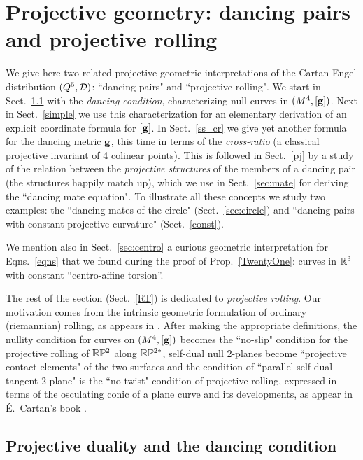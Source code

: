




\section{Projective geometry:  dancing pairs and projective rolling}

We give here two related projective geometric interpretations of the Cartan-Engel distribution $(Q^5,{\mathcal D})$: ``dancing pairs" and ``projective rolling".   We start in Sect.~\ref{sec_danc} with the {\em dancing condition},  characterizing   null curves in $(M^4, [\mathbf{ g}])$. Next  in Sect.~\ref{simple} we use this characterization for an elementary derivation of an explicit  coordinate formula for $[\mathbf{ g}]$. In Sect.~\ref{ss_cr} we give yet another formula for the dancing metric $\mathbf{ g}$, this time in terms of the {\em cross-ratio} (a classical projective invariant of 4 colinear points). This is followed in Sect.~\ref{pj} by a study of the relation between the {\em projective structures} of the members of a dancing pair (the structures  happily match up), which we use in Sect.~\ref{sec:mate} for deriving the ``dancing mate equation". 
To illustrate all these concepts we study two examples: the  ``dancing mates of the circle" (Sect.~\ref{sec:circle}) and ``dancing pairs with constant projective curvature"  (Sect.~\ref{const}). 

We mention also in Sect.~\ref{sec:centro} a curious geometric interpretation for Eqns.~\eqref{eqns} that we found  during the proof of Prop.~\ref{TwentyOne}: curves in $\mathbb{R}^3$ with constant ``centro-affine torsion''. 



The rest of the section (Sect.~\ref{RT}) is dedicated to {\em projective rolling}. Our motivation comes from the intrinsic geometric formulation of ordinary (riemannian) rolling, as appears in \cite{BrHs}. After making the appropriate definitions,  the nullity condition for curves on $(M^4, [\mathbf{ g}])$ becomes  the ``no-slip" condition for the projective rolling of $\mathbb{R}\mathbb{P}^2$ along $\mathbb{R}\mathbb{P}^{2*}$, self-dual null 2-planes become ``projective contact elements" of the two surfaces and the condition of ``parallel self-dual tangent 2-plane" is the ``no-twist" condition of projective rolling, expressed in terms of the osculating conic of a plane curve and its developments, as appear in \'E.~Cartan's book \cite{Cbook}. 


\subsection{Projective duality and the dancing condition}\label{sec_danc}

